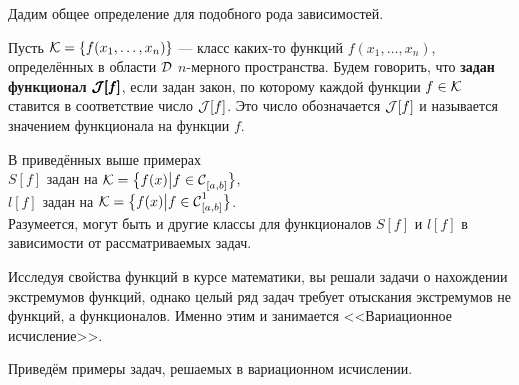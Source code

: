 \noindent Дадим общее определение для подобного рода зависимостей.
\begin{Def}
	Пусть $\mc{K}=\{f(x_1,\ldots,x_n)\}$ --- класс каких-то функций $f(x_1,\ldots,x_n)$, определённых в области $\mc{D}$ $n$-мерного пространства. Будем говорить, что \textbf{задан функционал $\pmb{\J[f]}$}, если задан закон, по которому каждой функции $f\in\mc{K}$ ставится в соответствие число $\J[f]$. Это число обозначается $\J[f]$ и называется значением функционала на функции $f$.
\end{Def}

\noindent В приведённых выше примерах \\
\indent$S[f]$ задан на $\mc{K}=\big\{f(x)\big|f\in \Cfn[{[a,b]}]{}\big\}$,\\
\indent $l[f]$ задан на $\mc{K}=\big\{f(x)\big|f\in \Cfn[{[a,b]}]{1}\big\}$.\\
Разумеется, могут быть и другие классы для функционалов $S[f]$ и $l[f]$ в зависимости от рассматриваемых задач.

Исследуя свойства функций в курсе математики, вы решали задачи о нахождении экстремумов функций, однако целый ряд задач требует отыскания экстремумов не функций, а функционалов. Именно этим и занимается <<Вариационное исчисление>>.
\vspace{0.25cm}

Приведём примеры задач, решаемых в вариационном исчислении.

